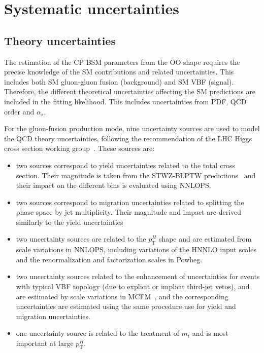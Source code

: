 \section{Systematic uncertainties}
\label{sec:syst}


\subsection{Theory uncertainties}
\label{ssec:theoryuncert}
The estimation of the CP BSM parameters from the OO shape requires the precise knowledge of the SM contributions and related uncertainties. This includes both SM gluon-gluon fusion (background) and SM VBF (signal).
 Therefore, the different theoretical uncertainties affecting the SM predictions are included in the fitting likelihood. This includes uncertainties from PDF, QCD order and $\alpha_s$.

For the gluon-fusion production mode, nine uncertainty sources are used to model the QCD theory
uncertainties, following the recommendation of the LHC Higgs cross section working group~\cite{LHCXS_4}. These sources are:
\begin{itemize}
\item two sources correspond to yield uncertainties related to the total cross section. Their magnitude is taken from the
STWZ-BLPTW predictions~\cite{ggF_qcd_unc_1,ggF_qcd_unc_2,LHCXS_4} and their impact on the different bins is evaluated using
NNLOPS.
\item two sources correspond to migration uncertainties related to splitting the phase space by jet multiplicity. Their magnitude and impact are derived similarly to the yield uncertainties
\item two uncertainty sources are related to the $p_\mathrm{T}^H$ shape and are estimated from scale
variations in NNLOPS, including variations of the HNNLO input scales and the renormalization
and factorization scales in Powheg.
\item two uncertainty sources related to the enhancement of uncertainties for events with typical VBF topology (due to explicit or implicit third-jet vetos), and are estimated by scale variations in MCFM~\cite{MCFM}, and the corresponding uncertainties are estimated using the same procedure use for yield and migration uncertainties.
\item one uncertainty source is related to the treatment of $m_t$ and is most important at large $p_\mathrm{T}^H$.
\end{itemize}


